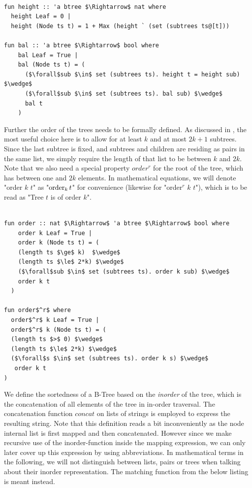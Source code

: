 \begin{lstlisting}[mathescape=true, language=Isabelle]

fun height :: 'a btree $\Rightarrow$ nat where
  height Leaf = 0 |
  height (Node ts t) = 1 + Max (height ` (set (subtrees ts@[t]))

fun bal :: 'a btree $\Rightarrow$ bool where
    bal Leaf = True |
    bal (Node ts t) = (
      ($\forall$sub $\in$ set (subtrees ts). height t = height sub) $\wedge$
      ($\forall$sub $\in$ set (subtrees ts). bal sub) $\wedge$
      bal t
    )
\end{lstlisting}

Further the order of the trees needs to be formally defined.
As discussed in , the most useful choice here is
to allow for at least $k$ and at most $2k+1$ subtrees.
Since the last subtree is fixed, and subtrees and children are residing as pairs in the same list,
we simply require the length of that list to be between $k$ and $2k$.
Note that we also need a special property $order^r$ for the root of the tree,
which has between one and $2k$ elements.
In mathematical equations, we will denote "order $k$ $t$" as "$\operatorname{order}_k t$"
for convenience (likewise for "order$^r$ $k$ $t$"), which is to be read as
"Tree $t$ is of order $k$".

\begin{lstlisting}[mathescape=true, language=Isabelle]

fun order :: nat $\Rightarrow$ 'a btree $\Rightarrow$ bool where
    order k Leaf = True |
    order k (Node ts t) = (
    (length ts $\ge$ k)  $\wedge$
    (length ts $\le$ 2*k) $\wedge$
    ($\forall$sub $\in$ set (subtrees ts). order k sub) $\wedge$
    order k t
  )

fun order$^r$ where
  order$^r$ k Leaf = True |
  order$^r$ k (Node ts t) = (
  (length ts $>$ 0) $\wedge$
  (length ts $\le$ 2*k) $\wedge$
  ($\forall$s $\in$ set (subtrees ts). order k s) $\wedge$
   order k t
)

\end{lstlisting}

We define the sortedness of a B-Tree based on the \textit{inorder} of the tree,
which is the concatenation of all elements of the tree in in-order traversal.
The concatenation function $concat$ on lists of strings
is employed to express the resulting string.
Note that this definition reads a bit inconveniently
as the node internal list is first mapped and then concatenated.
However since we make recursive use of the inorder-function
inside the mapping expression, we can only later cover up this expression
by using abbreviations.
In mathematical terms in the following, we will not distinguish between lists, 
pairs or trees when talking about their inorder representation.
The matching function from the below listing is meant instead.

